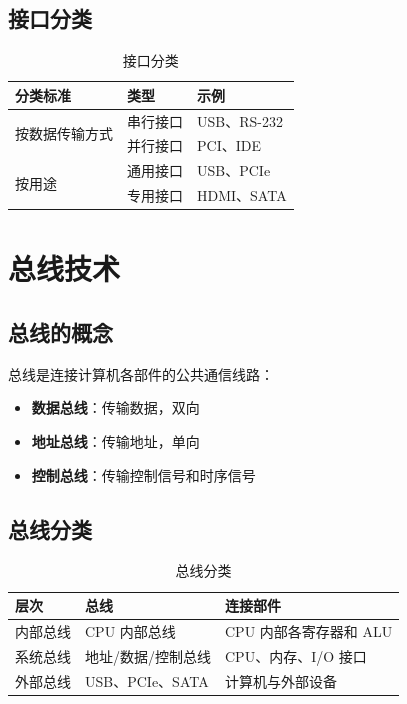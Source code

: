 \documentclass[12pt,UTF8]{ctexbook}
\begin{document}
\section{接口分类}

\begin{table}[htbp]
    \centering
    \caption{接口分类}
    \begin{tabular}{|p{3cm}|p{3cm}|p{4cm}|}
        \hline
        \textbf{分类标准} & \textbf{类型} & \textbf{示例} \\
        \hline
        \multirow{2}{*}{按数据传输方式} & 串行接口 & USB、RS-232 \\
        \cline{2-3}
         & 并行接口 & PCI、IDE \\
        \hline
        \multirow{2}{*}{按用途} & 通用接口 & USB、PCIe \\
        \cline{2-3}
         & 专用接口 & HDMI、SATA \\
        \hline
    \end{tabular}
\end{table}

\chapter{总线技术}
\label{chap:bus}

\section{总线的概念}

总线是连接计算机各部件的公共通信线路：

\begin{itemize}[leftmargin=2cm]
    \item \textbf{数据总线}：传输数据，双向
    \item \textbf{地址总线}：传输地址，单向
    \item \textbf{控制总线}：传输控制信号和时序信号
\end{itemize}

\section{总线分类}

\begin{table}[htbp]
    \centering
    \caption{总线分类}
    \begin{tabular}{|p{3cm}|p{3cm}|p{4cm}|}
        \hline
        \textbf{层次} & \textbf{总线} & \textbf{连接部件} \\
        \hline
        内部总线 & CPU 内部总线 & CPU 内部各寄存器和 ALU \\
        \hline
        系统总线 & 地址/数据/控制总线 & CPU、内存、I/O 接口 \\
        \hline
        外部总线 & USB、PCIe、SATA & 计算机与外部设备 \\
        \hline
    \end{tabular}
\end{table}
\end{document}
